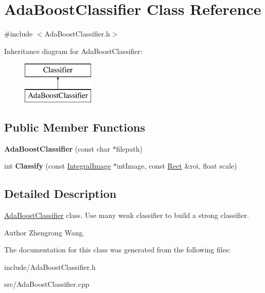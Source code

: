 \hypertarget{classAdaBoostClassifier}{}\section{Ada\+Boost\+Classifier Class Reference}
\label{classAdaBoostClassifier}


{\ttfamily \#include $<$Ada\+Boost\+Classifier.\+h$>$}

Inheritance diagram for Ada\+Boost\+Classifier\+:\begin{figure}[H]
\begin{center}
\leavevmode
\includegraphics[height=2.000000cm]{classAdaBoostClassifier}
\end{center}
\end{figure}
\subsection*{Public Member Functions}
\begin{DoxyCompactItemize}
\item 
\hypertarget{classAdaBoostClassifier_ab2182542e51a02064f8f5638c5447d07}{}{\bfseries Ada\+Boost\+Classifier} (const char $\ast$filepath)\label{classAdaBoostClassifier_ab2182542e51a02064f8f5638c5447d07}

\item 
\hypertarget{classAdaBoostClassifier_a39f399decacc9920b01b4012b26bdd6c}{}int {\bfseries Classify} (const \hyperlink{classIntegralImage}{Integral\+Image} $\ast$int\+Image, const \hyperlink{classRect}{Rect} \&roi, float scale)\label{classAdaBoostClassifier_a39f399decacc9920b01b4012b26bdd6c}

\end{DoxyCompactItemize}


\subsection{Detailed Description}
\hyperlink{classAdaBoostClassifier}{Ada\+Boost\+Classifier} class. Use many weak classifier to build a strong classifier. \begin{DoxyAuthor}{Author}
Zhengrong Wang. 
\end{DoxyAuthor}


The documentation for this class was generated from the following files\+:\begin{DoxyCompactItemize}
\item 
include/Ada\+Boost\+Classifier.\+h\item 
src/Ada\+Boost\+Classifier.\+cpp\end{DoxyCompactItemize}
